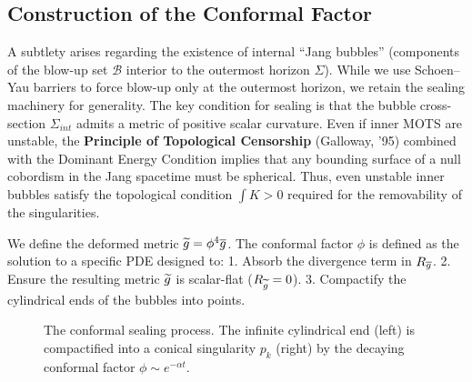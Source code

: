 \subsection{Construction of the Conformal Factor}
\label{sec:Construction}

\begin{remark}
A subtlety arises regarding the existence of internal ``Jang bubbles'' (components of the blow-up set $\mathcal{B}$ interior to the outermost horizon $\Sigma$).
While we use Schoen--Yau barriers to force blow-up only at the outermost horizon, we retain the sealing machinery for generality. The key condition for sealing is that the bubble cross-section $\Sigma_{int}$ admits a metric of positive scalar curvature.
Even if inner MOTS are unstable, the \textbf{Principle of Topological Censorship} (Galloway, '95) combined with the Dominant Energy Condition implies that any bounding surface of a null cobordism in the Jang spacetime must be spherical. Thus, even unstable inner bubbles satisfy the topological condition $\int K > 0$ required for the removability of the singularities.
\end{remark}

We define the deformed metric $\widetilde{g} = \phi^4 \overline{g}$. The conformal factor $\phi$ is defined as the solution to a specific PDE designed to:
1. Absorb the divergence term in $R_{\overline{g}}$.
2. Ensure the resulting metric $\widetilde{g}$ is scalar-flat ($R_{\widetilde{g}}=0$).
3. Compactify the cylindrical ends of the bubbles into points.

\begin{figure}[ht]
\centering
{}
\caption{The conformal sealing process. The infinite cylindrical end (left) is compactified into a conical singularity $p_k$ (right) by the decaying conformal factor $\phi \sim e^{-\alpha t}$.}
\label{fig:conformal_sealing}
\end{figure}

